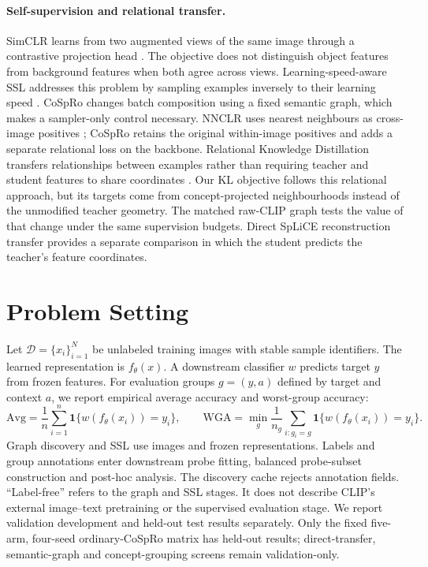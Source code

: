 \documentclass{article}
\begin{document}
\paragraph{Self-supervision and relational transfer.}
SimCLR learns from two augmented views of the same image through a contrastive
projection head \citep{chen2020simclr}. The objective does not distinguish
object features from background features when both agree across views.
Learning-speed-aware SSL addresses this problem by sampling examples inversely
to their learning speed \citep{zhu2023lassl}. CoSpRo changes batch composition
using a fixed semantic graph, which makes a sampler-only control necessary.
NNCLR uses nearest neighbours as cross-image positives
\citep{dwibedi2021nnclr}; CoSpRo retains the original within-image positives
and adds a separate relational loss on the backbone. Relational Knowledge
Distillation transfers relationships between examples rather than requiring
teacher and student features to share coordinates \citep{park2019rkd}.
Our KL objective follows this relational approach, but its targets come from
concept-projected neighbourhoods instead of the unmodified teacher geometry.
The matched raw-CLIP graph tests the value of that change under the same
supervision budgets. Direct SpLiCE reconstruction transfer provides a separate
comparison in which the student predicts the teacher's feature coordinates.

\section{Problem Setting}
Let $\mathcal{D}=\{x_i\}_{i=1}^{N}$ be unlabeled training images with stable
sample identifiers. The learned representation is $f_\theta(x)$. A downstream
classifier $w$ predicts target $y$ from frozen features. For evaluation groups
$g=(y,a)$ defined by target and context $a$, we report empirical average accuracy
and worst-group accuracy:
\begin{equation}
 \mathrm{Avg}=\frac{1}{n}\sum_{i=1}^{n}\mathbf{1}\{w(f_\theta(x_i))=y_i\},\qquad
 \mathrm{WGA}=\min_g\frac{1}{n_g}\sum_{i:g_i=g}\mathbf{1}\{w(f_\theta(x_i))=y_i\}.
\end{equation}
Graph discovery and SSL use images and frozen representations. Labels and group
annotations enter downstream probe fitting, balanced probe-subset construction
and post-hoc analysis. The discovery cache rejects annotation fields.
``Label-free'' refers to the graph and SSL stages. It does not describe CLIP's
external image--text pretraining or the supervised evaluation stage. We report
validation development and held-out test results separately. Only the fixed
five-arm, four-seed ordinary-CoSpRo matrix has held-out results; direct-transfer,
semantic-graph and concept-grouping screens remain validation-only.
\end{document}
